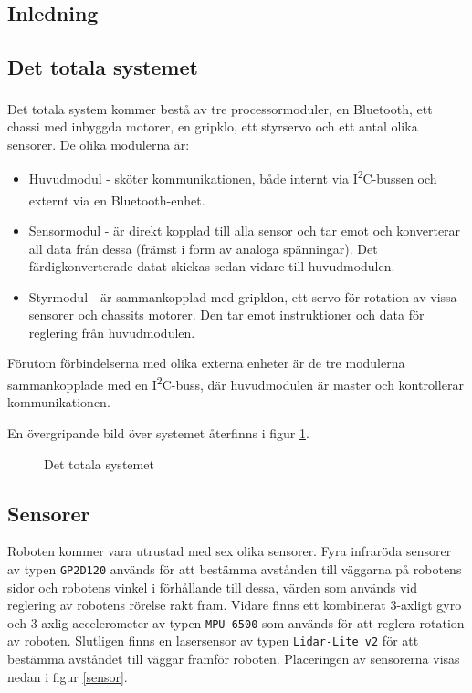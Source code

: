 \documentclass[11pt]{article}
\begin{document}
\begin{flushleft}
\section{Inledning}
\lipsum

\subsection{Det totala systemet}
Det totala system kommer bestå av tre processormoduler, en Bluetooth\textsuperscript{\circledR}, ett chassi med inbyggda motorer, en gripklo, ett styrservo och ett antal olika sensorer. De olika modulerna är:
\begin{itemize}
	\item Huvudmodul - sköter kommunikationen, både internt via I\textsuperscript{2}C-bussen och externt via en Bluetooth\textsuperscript{\circledR}-enhet.
	\item Sensormodul - är direkt kopplad till alla sensor och tar emot och konverterar all data från dessa (främst i form av analoga spänningar). Det färdigkonverterade datat skickas sedan vidare till huvudmodulen.
	\item Styrmodul - är sammankopplad med gripklon, ett servo för rotation av vissa sensorer och chassits motorer. Den tar emot instruktioner och data för reglering från huvudmodulen.
\end{itemize}
Förutom förbindelserna med olika externa enheter är de tre modulerna sammankopplade med en I\textsuperscript{2}C-buss, där huvudmodulen är master och kontrollerar kommunikationen. 

En övergripande bild över systemet återfinns i figur \ref{overview}.

\begin{figure}[!htbp]
\centering
\noindent\resizebox{\linewidth}{!}{
	}
	\caption{Det totala systemet \label{overview}}	
\end{figure}

\FloatBarrier
\subsection{Sensorer}
Roboten kommer vara utrustad med sex olika sensorer. Fyra infraröda sensorer av typen \verb+GP2D120+ används för att bestämma avstånden till väggarna på robotens sidor och robotens vinkel i förhållande till dessa, värden som används vid reglering av robotens rörelse rakt fram. Vidare finns ett kombinerat 3-axligt gyro och 3-axlig accelerometer av typen \verb+MPU-6500+ som används för att reglera rotation av roboten. Slutligen finns en lasersensor av typen \verb+Lidar-Lite v2+ för att bestämma avståndet till väggar framför roboten. Placeringen av sensorerna visas nedan i figur \ref{sensor}.


\end{flushleft}
\end{document}
